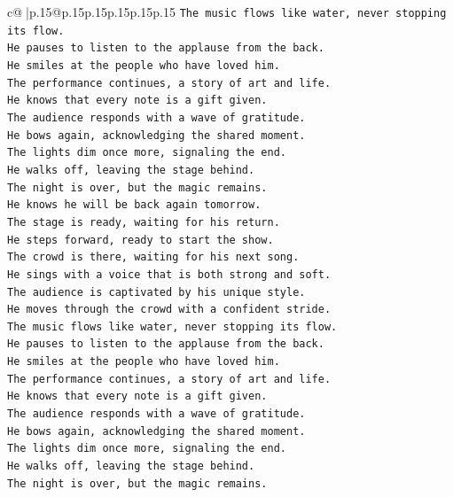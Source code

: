 \documentclass{article}
\begin{document}
{\begin{supertabular}{c@{$\;$}|p{.15\linewidth}@{}p{.15\linewidth}p{.15\linewidth}p{.15\linewidth}p{.15\linewidth}p{.15\linewidth}}
{{{\texttt{The music flows like water, never stopping its flow.} \\
\texttt{He pauses to listen to the applause from the back.} \\
\texttt{He smiles at the people who have loved him.} \\
\texttt{The performance continues, a story of art and life.} \\
\texttt{He knows that every note is a gift given.} \\
\texttt{The audience responds with a wave of gratitude.} \\
\texttt{He bows again, acknowledging the shared moment.} \\
\texttt{The lights dim once more, signaling the end.} \\
\texttt{He walks off, leaving the stage behind.} \\
\texttt{The night is over, but the magic remains.} \\
\texttt{He knows he will be back again tomorrow.} \\
\texttt{The stage is ready, waiting for his return.} \\
\texttt{He steps forward, ready to start the show.} \\
\texttt{The crowd is there, waiting for his next song.} \\
\texttt{He sings with a voice that is both strong and soft.} \\
\texttt{The audience is captivated by his unique style.} \\
\texttt{He moves through the crowd with a confident stride.} \\
\texttt{The music flows like water, never stopping its flow.} \\
\texttt{He pauses to listen to the applause from the back.} \\
\texttt{He smiles at the people who have loved him.} \\
\texttt{The performance continues, a story of art and life.} \\
\texttt{He knows that every note is a gift given.} \\
\texttt{The audience responds with a wave of gratitude.} \\
\texttt{He bows again, acknowledging the shared moment.} \\
\texttt{The lights dim once more, signaling the end.} \\
\texttt{He walks off, leaving the stage behind.} \\
\texttt{The night is over, but the magic remains.} \\
}}}
\end{supertabular}}
\end{document}
